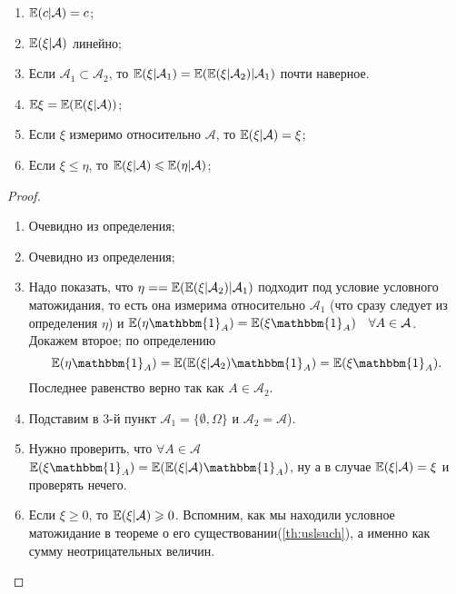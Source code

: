  \begin{properties}
\enewline
     \begin{enumerate}
         \item $\mathbb{E} (c|\mathcal{A}) = c$;
         \item $\mathbb{E} (\xi | \mathcal{A})$ линейно;
         \item  Если $\mathcal{A}_1 \subset \mathcal{A}_2$, то $\mathbb{E} (\xi | \mathcal{A}_1) = \mathbb{E} (\mathbb{E} (\xi | \mathcal{A}_2) | \mathcal{A}_1)$ почти наверное.
         \item $\mathbb{E} \xi = \mathbb{E} (\mathbb{E} (\xi | \mathcal{A}))$;
         \item Если $\xi $ измеримо относительно $\mathcal{A}$, то $\mathbb{E} (\xi | \mathcal{A}) = \xi$;
         \item Если $\xi \le \eta$, то $\mathbb{E} (\xi | \mathcal{A})\leqslant \mathbb{E} (\eta | \mathcal{A})$;

     \end{enumerate}
 \end{properties}
 
  \begin{proof}
\enewline
     \begin{enumerate}
         \item Очевидно из определения;
         \item Очевидно из определения;
         \item  Надо показать, что $\eta = = \mathbb{E} (\mathbb{E} (\xi | \mathcal{A}_2) | \mathcal{A}_1)$ подходит под условие условного матожидания, то есть она измерима относительно $\mathcal{A}_1$
                   (что сразу следует из определения $\eta$) и $\EE (\eta\mathbbm{1}_{A}) = \EE (\xi\mathbbm{1}_{A}) \quad \forall A \in \mathcal{A}$. Докажем второе; по определению 
                   $$\EE (\eta\mathbbm{1}_A) = \EE (\EE (\xi | \mathcal{A}_2)\mathbbm{1}_A) = \EE (\xi\mathbbm{1}_{A}).$$
                   Последнее равенство верно так как $A\in\mathcal{A}_2$.
        \item Подставим в 3-й пункт $\mathcal{A}_1 = \{\emptyset, \Omega\}$ и $\mathcal{A}_2 = \mathcal{A}$).
          \item   Нужно проверить, что $\forall A\in\mathcal{A}$ $\EE (\xi\mathbbm{1}_A) = \EE (\EE (\xi | \mathcal{A})\mathbbm{1}_A)$, ну а в
                   случае $\mathbb{E} (\xi |\mathcal{A}) = \xi$ и проверять нечего.
         \item  Если $\xi \ge 0$, то $\mathbb{E} (\xi | \mathcal{A}) \geqslant 0$. Вспомним, как мы находили условное матожидание в теореме о его существовании(\ref{th:uslsuch}), а именно как сумму неотрицательных величин. \qedhere

     \end{enumerate}
 \end{proof}
 
